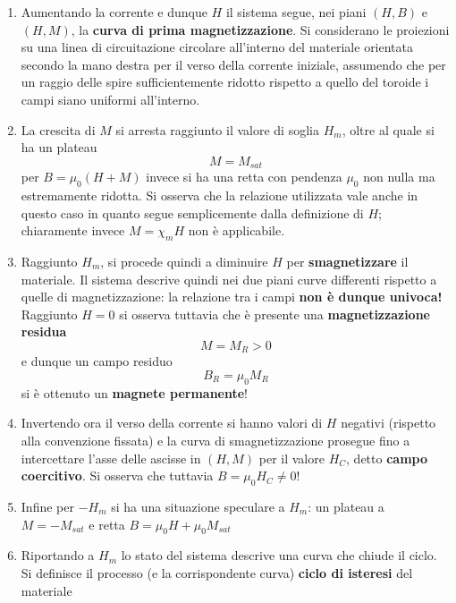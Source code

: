 \begin{enumerate}
\item Aumentando la corrente e dunque $H$ il sistema segue, nei piani $(H, B)$ e $(H, M)$, la \textbf{curva di prima magnetizzazione}. Si considerano le proiezioni su una linea di circuitazione circolare all'interno del materiale orientata secondo la mano destra per il verso della corrente iniziale, assumendo che per un raggio delle spire sufficientemente ridotto rispetto a quello del toroide i campi siano uniformi all'interno.
\item La crescita di $M$ si arresta raggiunto il valore di soglia $H_m$, oltre al quale si ha un plateau
\[M = M_{sat}\]
per $B = \mu_0 (H + M)$ invece si ha una retta con pendenza $\mu_0$ non nulla ma estremamente ridotta. Si osserva che la relazione utilizzata vale anche in questo caso in quanto segue semplicemente dalla definizione di $H$; chiaramente invece $M = \chi_m H$ non è applicabile.

\item Raggiunto $H_m$, si procede quindi a diminuire $H$ per \textbf{smagnetizzare} il materiale. Il sistema descrive quindi nei due piani curve differenti rispetto a quelle di magnetizzazione: la relazione tra i campi \textbf{non è dunque univoca!}
\\Raggiunto $H = 0$ si osserva tuttavia che è presente una \textbf{magnetizzazione residua}
\[M = M_R > 0\]
e dunque un campo residuo
\[B_R = \mu_0 M_R\]
si è ottenuto un \textbf{magnete permanente}!

\item Invertendo ora il verso della corrente si hanno valori di $H$ negativi (rispetto alla convenzione fissata) e la curva di smagnetizzazione prosegue fino a intercettare l'asse delle ascisse in $(H,M)$ per il valore $H_C$, detto \textbf{campo coercitivo}. Si osserva che tuttavia $B = \mu_0 H_C \neq 0$!

\item Infine per $-H_m$ si ha una situazione speculare a $H_m$: un plateau a $M = - M_{sat}$ e retta $B = \mu_0 H + \mu_0 M_{sat}$

\item Riportando a $H_m$ lo stato del sistema descrive una curva che chiude il ciclo. Si definisce il processo (e la corrispondente curva) \textbf{ciclo di isteresi} del materiale
\end{enumerate}

